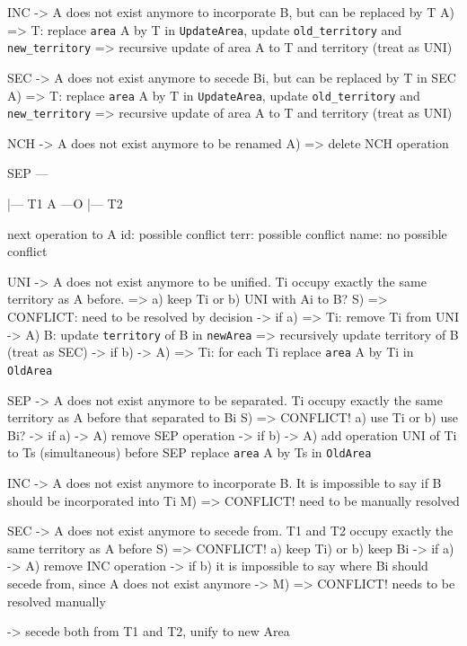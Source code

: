  INC -> A does not exist anymore to incorporate B, but can be replaced by T
A)    => T: replace \texttt{area} A by T in \texttt{UpdateArea},
          update \texttt{old\_territory} and \texttt{new\_territory}
        => recursive update of area A to T and territory (treat as UNI)

  SEC -> A does not exist anymore to secede Bi, but can be replaced by T in SEC
A)    => T: replace \texttt{area} A by T in \texttt{UpdateArea},
          update \texttt{old\_territory} and \texttt{new\_territory}
        => recursive update of area A to T and territory (treat as UNI)

  NCH -> A does not exist anymore to be renamed
A)    => delete NCH operation


SEP
---

     |--- T1
A ---O
     |--- T2

next operation to A
  id:   possible conflict
  terr: possible conflict
  name: no possible conflict

  UNI -> A does not exist anymore to be unified. Ti occupy exactly the same territory as A before.
      => a) keep Ti or b) UNI with Ai to B?
S)      => CONFLICT: need to be resolved by decision
        -> if a)
          => Ti: remove Ti from UNI
-> A)        B: update \texttt{territory} of B in \texttt{newArea}
              => recursively update territory of B (treat as SEC)
        -> if b)
-> A)     => Ti: for each Ti replace \texttt{area} A by Ti in \texttt{OldArea}

  SEP -> A does not exist anymore to be separated. Ti occupy exactly the same territory as A before that separated to Bi
S)    => CONFLICT! a) use Ti or b) use Bi?
        -> if a)
-> A)     remove SEP operation
        -> if b)
-> A)     add operation UNI of Ti to Ts (simultaneous) before SEP
          replace \texttt{area} A by Ts in \texttt{OldArea}

  INC -> A does not exist anymore to incorporate B. It is impossible to say if B should be incorporated into Ti
M)    => CONFLICT! need to be manually resolved

  SEC -> A does not exist anymore to secede from. T1 and T2 occupy exactly the same territory as A before
S)    => CONFLICT! a) keep Ti) or b) keep Bi
      -> if a)
-> A)    remove INC operation
      -> if b)
        it is impossible to say where Bi should secede from, since A does not exist anymore
-> M)    => CONFLICT! needs to be resolved manually

      -> secede both from T1 and T2, unify to new Area

